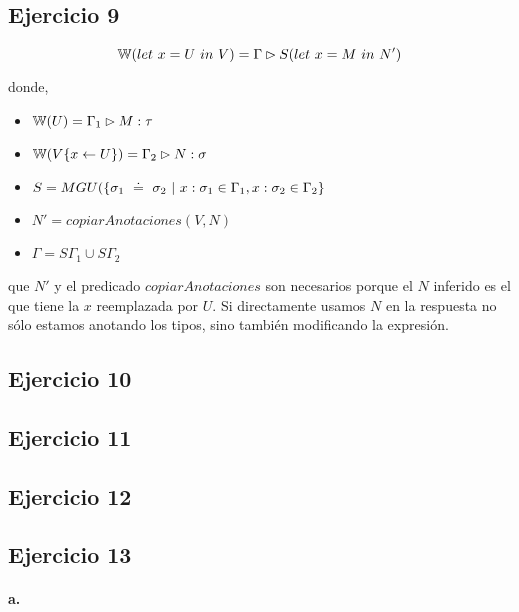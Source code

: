 
\subsection*{Ejercicio 9}

\[\mathbb{W}(let\ x = U\ in\ V) = \Gamma \rhd S(let\ x = M\ in\ N')\]

donde,

\begin{itemize}
  \item $\mathbb{W}(U) = \Gamma_1 \rhd M : \tau$
  \item $\mathbb{W}(V\{x\leftarrow U\}) = \Gamma_2 \rhd N: \sigma$
  \item $S = MGU(\{\sigma_1 \uni \sigma_2 \vert x:\sigma_1 \in \Gamma_1, x:\sigma_2 \in \Gamma_2\}$
  \item $N' = copiarAnotaciones(V,N)$
  \item $\Gamma = S\Gamma_1 \cup S\Gamma_2$
\end{itemize}

 que $N'$ y el predicado $copiarAnotaciones$ son necesarios porque el $N$ inferido es el que tiene la $x$ reemplazada por $U$. Si directamente usamos $N$ en la respuesta no sólo estamos anotando los tipos, sino también modificando la expresión.


\subsection*{Ejercicio 10}


\subsection*{Ejercicio 11}


\subsection*{Ejercicio 12}


\subsection*{Ejercicio 13}

\paragraph{a.}

